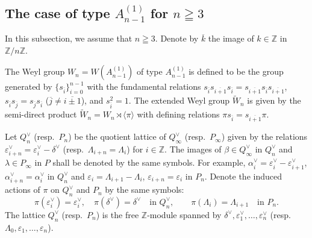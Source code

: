 \documentclass[12pt,twoside]{article}
\newcommand\tW{{\widetilde W}}
\newcommand\av{\alpha^\vee}
\newcommand\eps{\varepsilon}
\newcommand\epsv{\eps^\vee}
\newcommand\deltav{\delta^\vee}
\newcommand\Qv{Q^\vee}
\newcommand\bra{\langle}
\newcommand\ket{\rangle}
\newcommand\Z{{\mathbb Z}} %
\theoremstyle{plain} %
\theoremstyle{definition} %
\theoremstyle{definition} %
\numberwithin{theorem}{section}
\numberwithin{equation}{section}
\numberwithin{figure}{section}
\numberwithin{table}{section}
\begin{document}

\subsection{The case of type $A^{(1)}_{n-1}$ for $n\geqq 3$}
\label{sec:A^{(1)}_{n-1}}

In this subsection, we assume that $n\geqq 3$.
Denote by $\overline k$ the image of $k\in\Z$ in $\Z/n\Z$.

The Weyl group $W_n=W(A^{(1)}_{n-1})$ of type $A^{(1)}_{n-1}$ is defined to be
the group generated by $\{s_{\overline{i}}\}_{i=0}^{n-1}$
with the fundamental relations
\(
  s_{\overline{i}}s_{\overline{i+1}}s_{\overline{i}}
= s_{\overline{i+1}}s_{\overline{i}}s_{\overline{i+1}}
\), \(
  s_{\overline{i}}s_{\overline{j}}
= s_{\overline{j}}s_{\overline{i}}
\) ($\overline{j}\ne\overline{i\pm1}$), and
$s_{\overline{i}}^2 = 1$.
The extended Weyl group $\tW_n$ is given by the semi-direct
product $\tW_n=W_n\rtimes\bra\pi\ket$ with defining relations
$\pi s_{\overline{i}} = s_{\overline{i+1}} \pi$.

Let $\Qv_n$ (resp.\ $P_n$) be the quotient lattice 
of $\Qv_\infty$ (resp.\ $P_\infty$)
given by the relations $\epsv_{i+n}=\epsv_i-\deltav$
(resp.\ $\Lambda_{i+n}=\Lambda_i$) for $i\in\Z$.
The images of $\beta\in\Qv_\infty$ in $\Qv_n$ 
and $\lambda\in P_\infty$ in $P$ 
shall be denoted by the same symbols.
For example, $\av_i = \epsv_i - \epsv_{i+1}$, $\av_{i+n}=\av_i$ in $\Qv_n$ 
and $\eps_i = \Lambda_{i+1}-\Lambda_i$, $\eps_{i+n}=\eps_i$ in $P_n$.
Denote the induced actions of $\pi$ on $\Qv_n$ and $P_n$ by the same symbols:
\begin{equation*}
 \pi(\epsv_i) = \epsv_i, \quad
 \pi(\deltav) = \deltav
 \quad \text{in $\Qv_n$}, \qquad
 \pi(\Lambda_i) = \Lambda_{i+1}
 \quad \text{in $P_n$}.
\end{equation*}
The lattice $\Qv_n$ (resp.\ $P_n$) is the free $\Z$-module
spanned by $\deltav,\epsv_1,\ldots,\epsv_n$
(resp.\ $\Lambda_0,\eps_1,\ldots,\eps_n$).
\end{document}
